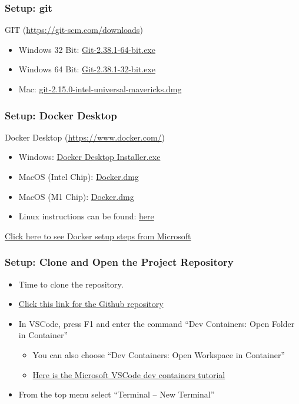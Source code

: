 \documentclass[aspectratio=169]{beamer}
\begin{document}
\begin{frame}
	\frametitle{Setup: git}
	GIT (\href{https://git-scm.com/downloads}{https://git-scm.com/downloads})
	\begin{itemize}
		\item Windows 32 Bit: \href{https://prereqs.codemash.org/Files/Git-2.38.1-64-bit.exe}{Git-2.38.1-64-bit.exe}
		\item Windows 64 Bit: \href{https://prereqs.codemash.org/Files/Git-2.38.1-32-bit.exe}{Git-2.38.1-32-bit.exe}
		\item Mac: \href{https://prereqs.codemash.org/Files/git-2.15.0-intel-universal-mavericks.dmg}{git-2.15.0-intel-universal-mavericks.dmg}
	\end{itemize}
\end{frame}

\begin{frame}
	\frametitle{Setup: Docker Desktop}
	Docker Desktop (\href{https://www.docker.com/}{https://www.docker.com/})

	\begin{itemize}
		\item Windows: \href{https://prereqs.codemash.org/Files/Docker\%20Desktop\%20Installer.exe}{Docker Desktop Installer.exe}
		\item MacOS (Intel Chip): \href{https://prereqs.codemash.org/Files/Docker.dmg}{Docker.dmg}
		\item MacOS (M1 Chip): \href{https://prereqs.codemash.org/Files/Chip/Docker.dmg}{Docker.dmg}
		\item Linux instructions can be found: \href{https://docs.docker.com/desktop/install/linux-install/}{here}
	\end{itemize}
	\vspace{2mm}

	\href{https://code.visualstudio.com/docs/devcontainers/containers\#\_installation}{Click here to see Docker setup steps from Microsoft}

\end{frame}


\begin{frame}
	\frametitle{Setup: Clone and Open the Project Repository}

	\begin{itemize}
		\item Time to clone the repository.
		\item \href{https://github.com/devsecfranklin/workshop-codemash-2023}{Click this link for the Github repository}
		\item In VSCode, press F1 and enter the command ``Dev Containers: Open Folder in Container''
		\begin{itemize}
			\item You can also choose ``Dev Containers: Open Workspace in Container''
			\item \href{https://code.visualstudio.com/docs/devcontainers/tutorial}{Here is the Microsoft VSCode dev containers tutorial}
		\end{itemize}
		\item From the top menu select ``Terminal -- New Terminal''
	\end{itemize}
	\vspace{2mm}
\end{frame}
\end{document}
